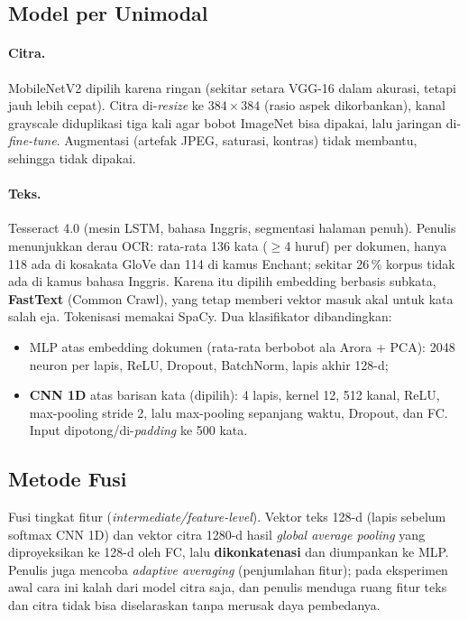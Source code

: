 \subsection{Model per Unimodal}
\paragraph{Citra.} MobileNetV2 dipilih karena ringan (sekitar setara VGG-16 dalam
akurasi, tetapi jauh lebih cepat). Citra di-\emph{resize} ke $384\times384$ (rasio
aspek dikorbankan), kanal grayscale diduplikasi tiga kali agar bobot ImageNet bisa
dipakai, lalu jaringan di-\emph{fine-tune}. Augmentasi (artefak JPEG, saturasi, kontras)
tidak membantu, sehingga tidak dipakai.

\paragraph{Teks.} Tesseract 4.0 (mesin LSTM, bahasa Inggris, segmentasi halaman penuh).
Penulis menunjukkan derau OCR: rata-rata 136 kata ($\geq$4 huruf) per dokumen, hanya 118
ada di kosakata GloVe dan 114 di kamus Enchant; sekitar 26\,\% korpus tidak ada di kamus
bahasa Inggris. Karena itu dipilih embedding berbasis subkata, \textbf{FastText} (Common
Crawl), yang tetap memberi vektor masuk akal untuk kata salah eja. Tokenisasi memakai
SpaCy. Dua klasifikator dibandingkan:
\begin{itemize}
  \item MLP atas embedding dokumen (rata-rata berbobot ala Arora + PCA): 2048 neuron per
        lapis, ReLU, Dropout, BatchNorm, lapis akhir 128-d;
  \item \textbf{CNN 1D} atas barisan kata (dipilih): 4 lapis, kernel 12, 512 kanal, ReLU,
        max-pooling stride 2, lalu max-pooling sepanjang waktu, Dropout, dan FC. Input
        dipotong/di-\emph{padding} ke 500 kata.
\end{itemize}

\subsection{Metode Fusi}
Fusi tingkat fitur (\emph{intermediate/feature-level}). Vektor teks 128-d (lapis
sebelum softmax CNN 1D) dan vektor citra 1280-d hasil \emph{global average pooling} yang
diproyeksikan ke 128-d oleh FC, lalu \textbf{dikonkatenasi} dan diumpankan ke MLP.
Penulis juga mencoba \emph{adaptive averaging} (penjumlahan fitur); pada eksperimen awal
cara ini kalah dari model citra saja, dan penulis menduga ruang fitur teks dan citra
tidak bisa diselaraskan tanpa merusak daya pembedanya.

